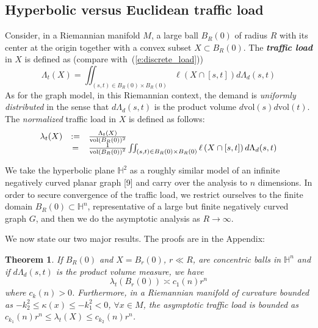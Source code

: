 \documentclass{article}
\newcommand{\vol}{\mathrm{vol}}
\newtheorem{theorem}{Theorem}
\begin{document}
\noindent 
\subsection{Hyperbolic versus Euclidean traffic load}
\label{s:euclidean_vs_hyperbolic}

Consider, in a Riemannian manifold $M$, a large ball $B_R(0)$ of radius $R$ with its center at the origin together with a convex subset $X\subset B_R(0)$. The \textit{\textbf{traffic load}} in $X$ is defined as (compare with~(\ref{e:discrete_load}))
\[\Lambda _{t} (X)=\iint \nolimits _{(s,t)\in B_R(0)\times B_R(0)}\ell \left(X\cap [s,t]\right)d\Lambda _{d} (s,t) \] 
As for the graph model, in this Riemannian context, 
the demand is {\it uniformly distributed} in the sense that $d\Lambda_d(s,t)$ is the 
product volume $d\vol(s)d\vol(t)$. 
The \textit{normalized} traffic load in $X$ is defined as follows:
\begin{equation}
\label{e:normalized_traffic_load}
\begin{array}{rcl} 
\lambda _{t} (X)&:=&\frac{\Lambda _{t} (X)}{{\rm vol}(B_R(0))^{2}}   \\
&=&\frac{1}{\vol\left(B_R(0)\right)^{2} } \iint \nolimits _{(s,t)\in B_R(0)\times B_R(0)}\ell \left(X\cap [s,t]\right)d\Lambda _{d} (s,t)  \end{array} 
\end{equation}






We take the hyperbolic plane $\mathbb{H}^{2} $ as a roughly similar model 
of an infinite negatively curved planar graph [9] and carry over the analysis to $n$ dimensions. 
In order to secure convergence of the traffic load, 
we restrict ourselves to the finite domain $B_R(0)\subset \mathbb{H}^n$,  
representative of a large but finite negatively curved graph $G$,  
and then we do the asymptotic analysis as $R \rightarrow \infty$. 

We now state our two major results. The proofs are in the Appendix: 
\begin{theorem}
\label{t:hyperbolic_traffic}
If $B_R(0)$ and $X=B_r(0)$, $r\ll R$, are concentric balls in $\mathbb{H}^n$ 
and if $d\Lambda _{d} (s,t)$ is the product volume measure, 
we have 
$$\lambda _{t} (B_r(0))\asymp c_1(n)r^n$$ 
where $c_k(n)>0$. Furthermore, 
in a Riemannian manifold of curvature bounded as $-k_2^2 \leq \kappa(x) \leq -k_1^2<0$, $\forall x \in M$, 
the asymptotic traffic load is bounded as $c_{k_1}(n) r^n \leq \lambda_t(X) \leq c_{k_2}(n)r^n$. 
\end{theorem}
\end{document}

